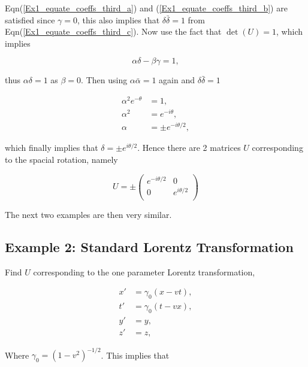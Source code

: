 \noindent Eqn(\ref{Ex1_equate_coeffs_third_a}) and (\ref{Ex1_equate_coeffs_third_b}) are satisfied since $\gamma = 0$, this also implies that $\delta \bar{\delta} = 1$ from Eqn(\ref{Ex1_equate_coeffs_third_c}). Now use the fact that $\det{(U)} = 1$, which implies

\begin{equation*}
\alpha \delta - \beta \gamma = 1,
\end{equation*}

\noindent thus $\alpha \delta = 1$ as $\beta = 0$. Then using $\alpha \bar{\alpha} = 1$ again and $\delta \bar{\delta} = 1$

\begin{align*}
\alpha^2 e^{-\theta} & = 1, \\
\alpha^2 & = e^{-i\theta}, \\
\alpha & = \pm e^{{-i\theta}/2}, 
\end{align*}

\noindent which finally implies that $\delta = \pm e^{i\theta/2}$. Hence there are 2 matrices $U$ corresponding to the spacial rotation, namely

\begin{equation*}
U = \pm
\left(
\begin{array}{cc}
e^{-i\theta/2} & 0            \\
0              & e^{i\theta/2} \\
\end{array}
\right)
\end{equation*}

\noindent The next two examples are then very similar.

\subsection{Example 2: Standard Lorentz Transformation}\label{Special_Linear_Matrices_Example_2}

\noindent Find $U$ corresponding to the one parameter Lorentz transformation,

\begin{align}
\nonumber 
x' & = \gamma_0 (x-vt), 
\\\nonumber
t' & = \gamma_0 (t-vx), 
\\\nonumber
y' & = y, 
\\\label{Special_Matrices_Standard_Lorentz}
z' & = z, 
\end{align} 

\noindent Where $\gamma_0 = (1-v^2)^{-1/2}$.  This implies that

